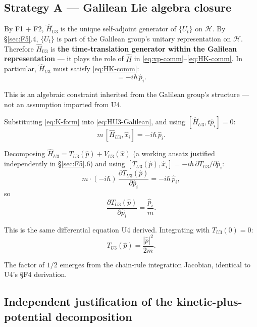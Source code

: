 \documentclass[11pt,a4paper]{article}
\begin{document}
\subsection{Strategy A --- Galilean Lie algebra closure}

By F1 + F2, $\hat{H}_{U3}$ is the unique self-adjoint generator of $\{U_t\}$ on $\mathcal{H}$. By \S\ref{sec:F5}.4, $\{U_t\}$ is part of the Galilean group's unitary representation on $\mathcal{H}$. Therefore $\hat{H}_{U3}$ is \textbf{the time-translation generator within the Galilean representation} --- it plays the role of $\hat{H}$ in \eqref{eq:xp-comm}--\eqref{eq:HK-comm}. In particular, $\hat{H}_{U3}$ must satisfy \eqref{eq:HK-comm}:
\begin{equation}
[\hat{H}_{U3}, \hat{K}_i] = -i\hbar \, \hat{p}_i. \label{eq:HU3-Galilean}
\end{equation}

This is an algebraic constraint inherited from the Galilean group's structure --- not an assumption imported from U4.

Substituting \eqref{eq:K-form} into \eqref{eq:HU3-Galilean}, and using $[\hat{H}_{U3}, t\hat{p}_i] = 0$:
\begin{equation}
m \, [\hat{H}_{U3}, \hat{x}_i] = -i\hbar \, \hat{p}_i. \label{eq:HU3-x-comm}
\end{equation}

Decomposing $\hat{H}_{U3} = T_{U3}(\hat{p}) + V_{U3}(\hat{x})$ (a working ansatz justified independently in \S\ref{sec:F5}.6) and using $[T_{U3}(\hat{p}), \hat{x}_i] = -i\hbar \, \partial T_{U3}/\partial \hat{p}_i$:
\[
m \cdot (-i\hbar) \, \frac{\partial T_{U3}(\hat{p})}{\partial \hat{p}_i} = -i\hbar \, \hat{p}_i,
\]
so
\begin{equation}
\frac{\partial T_{U3}(\hat{p})}{\partial \hat{p}_i} = \frac{\hat{p}_i}{m}. \label{eq:TU3-deriv}
\end{equation}

This is the same differential equation U4 derived. Integrating with $T_{U3}(0) = 0$:
\begin{equation}
T_{U3}(\hat{p}) = \frac{|\hat{p}|^2}{2m}. \label{eq:TU3-result}
\end{equation}

The factor of $1/2$ emerges from the chain-rule integration Jacobian, identical to U4's \S F4 derivation.

\subsection{Independent justification of the kinetic-plus-potential decomposition}
\end{document}
